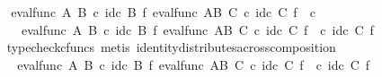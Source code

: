 \begin{isabellebody}
\ {\isacharminus}{\kern0pt}\ \isanewline
\ \ \ \ \ \ \ \ \isamarkupfalse%
\ {\isachardoublequoteopen}eval{\isacharunderscore}{\kern0pt}func\ A\ B\ {\isasymcirc}\isactrlsub c\ id\isactrlsub c\ B\ {\isasymtimes}\isactrlsub f\ {\isacharparenleft}{\kern0pt}eval{\isacharunderscore}{\kern0pt}func\ {\isacharparenleft}{\kern0pt}A\isactrlbsup B\isactrlesup {\isacharparenright}{\kern0pt}\ C\ {\isasymcirc}\isactrlsub c\ {\isacharparenleft}{\kern0pt}id\isactrlsub c\ C\ {\isasymtimes}\isactrlsub f\ {\isasymphi}\isactrlsup {\isasymsharp}\isactrlsup {\isasymsharp}\ {\isasymcirc}\isactrlsub c\ {\isasympsi}\isactrlsup {\isasymsharp}{\isacharparenright}{\kern0pt}{\isacharparenright}{\kern0pt}\ {\isacharequal}{\kern0pt}\isanewline
\ \ \ \ \ \ \ \ \ \ \ \ \ \ eval{\isacharunderscore}{\kern0pt}func\ A\ B\ {\isasymcirc}\isactrlsub c\ id\isactrlsub c\ B\ {\isasymtimes}\isactrlsub f\ {\isacharparenleft}{\kern0pt}eval{\isacharunderscore}{\kern0pt}func\ {\isacharparenleft}{\kern0pt}A\isactrlbsup B\isactrlesup {\isacharparenright}{\kern0pt}\ C\ {\isasymcirc}\isactrlsub c\ {\isacharparenleft}{\kern0pt}id\isactrlsub c\ C\ {\isasymtimes}\isactrlsub f\ {\isasymphi}\isactrlsup {\isasymsharp}\isactrlsup {\isasymsharp}{\isacharparenright}{\kern0pt}\ {\isasymcirc}\isactrlsub c\ {\isacharparenleft}{\kern0pt}id\isactrlsub c\ C\ {\isasymtimes}\isactrlsub f\ {\isasympsi}\isactrlsup {\isasymsharp}{\isacharparenright}{\kern0pt}{\isacharparenright}{\kern0pt}{\isachardoublequoteclose}\isanewline
\ \ \ \ \ \ \ \ \ \ \isamarkupfalse%
\ {\isacharparenleft}{\kern0pt}typecheck{\isacharunderscore}{\kern0pt}cfuncs{\isacharcomma}{\kern0pt}\ metis\ identity{\isacharunderscore}{\kern0pt}distributes{\isacharunderscore}{\kern0pt}across{\isacharunderscore}{\kern0pt}composition{\isacharparenright}{\kern0pt}\isanewline
\ \ \ \ \ \ \ \ \isamarkupfalse%
\ \isamarkupfalse%
\ {\isachardoublequoteopen}{\isachardot}{\kern0pt}{\isachardot}{\kern0pt}{\isachardot}{\kern0pt}\ {\isacharequal}{\kern0pt}\ eval{\isacharunderscore}{\kern0pt}func\ A\ B\ {\isasymcirc}\isactrlsub c\ id\isactrlsub c\ B\ {\isasymtimes}\isactrlsub f\ {\isacharparenleft}{\kern0pt}{\isacharparenleft}{\kern0pt}eval{\isacharunderscore}{\kern0pt}func\ {\isacharparenleft}{\kern0pt}A\isactrlbsup B\isactrlesup {\isacharparenright}{\kern0pt}\ C\ {\isasymcirc}\isactrlsub c\ {\isacharparenleft}{\kern0pt}id\isactrlsub c\ C\ {\isasymtimes}\isactrlsub f\ {\isasymphi}\isactrlsup {\isasymsharp}\isactrlsup {\isasymsharp}{\isacharparenright}{\kern0pt}{\isacharparenright}{\kern0pt}\ {\isasymcirc}\isactrlsub c\ {\isacharparenleft}{\kern0pt}id\isactrlsub c\ C\ {\isasymtimes}\isactrlsub f\ {\isasympsi}\isactrlsup {\isasymsharp}{\isacharparenright}{\kern0pt}{\isacharparenright}{\kern0pt}{\isachardoublequoteclose}\isanewline

\end{isabellebody}
